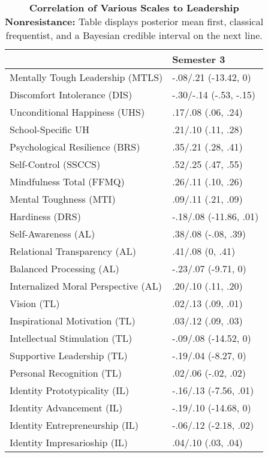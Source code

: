 \begin{table}[ht]
\centering
\begin{tabular}{ll}
  \hline
 & Semester 3 \\ 
  \hline
Mentally Tough Leadership (MTLS) & -.08/.21 (-13.42, 0) \\ 
  Discomfort Intolerance (DIS) & -.30/-.14 (-.53, -.15) \\ 
  Unconditional Happiness (UHS) & .17/.08 (.06, .24) \\ 
  School-Specific UH & .21/.10 (.11, .28) \\ 
  Psychological Resilience (BRS) & .35/.21 (.28, .41) \\ 
  Self-Control (SSCCS) & .52/.25 (.47, .55) \\ 
  Mindfulness Total (FFMQ) & .26/.11 (.10, .26) \\ 
  Mental Toughness (MTI) & .09/.11 (.21, .09) \\ 
  Hardiness (DRS) & -.18/.08 (-11.86, .01) \\ 
  Self-Awareness (AL) & .38/.08 (-.08, .39) \\ 
  Relational Transparency (AL) & .41/.08 (0, .41) \\ 
  Balanced Processing (AL) & -.23/.07 (-9.71, 0) \\ 
  Internalized Moral Perspective (AL) & .20/.10 (.11, .20) \\ 
  Vision (TL) & .02/.13 (.09, .01) \\ 
  Inspirational Motivation (TL) & .03/.12 (.09, .03) \\ 
  Intellectual Stimulation (TL) & -.09/.08 (-14.52, 0) \\ 
  Supportive Leadership (TL) & -.19/.04 (-8.27, 0) \\ 
  Personal Recognition (TL) & .02/.06 (-.02, .02) \\ 
  Identity Prototypicality (IL) & -.16/.13 (-7.56, .01) \\ 
  Identity Advancement (IL) & -.19/.10 (-14.68, 0) \\ 
  Identity Entrepreneurship (IL) & -.06/.12 (-2.18, .02) \\ 
  Identity Impresarioship (IL) & .04/.10 (.03, .04) \\ 
   \hline
\end{tabular}
\caption{\textbf{Correlation of Various Scales to Leadership Nonresistance:} Table displays posterior mean first, classical frequentist, and a Bayesian credible interval on the next line.} 
\label{tab:lnr_corr}
\end{table}
